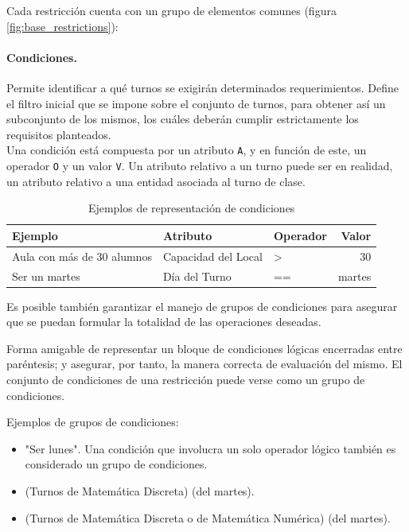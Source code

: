 Cada restricción cuenta con un grupo de elementos comunes (figura \ref{fig:base_restrictions}):\\

\paragraph{Condiciones.}
Permite identificar a qué turnos se exigirán determinados requerimientos. Define el filtro inicial que se impone sobre el conjunto de turnos, para obtener así un subconjunto de los mismos, los cuáles deberán cumplir estrictamente los requisitos planteados.\\
	
Una condición está compuesta por un atributo \texttt{A}, y en función de este, un operador \texttt{O} y un valor \texttt{V}. Un atributo relativo a un turno puede ser en realidad, un atributo relativo a una entidad asociada al turno de clase.\\

\begin{table}[h]
	\centering
	\begin{tabular}[c]{l|l|l|r}
		\textbf{Ejemplo}                   & \textbf{Atributo}     & \textbf{Operador} & \textbf{Valor} \\ 
		\hline 
		Aula con más de 30 alumnos         &  Capacidad del Local  & >                 & 30             \\ 
		Ser un martes					   & Día del Turno         & ==                & martes
	\end{tabular}
	\caption{Ejemplos de representación de condiciones}
	\label{tab:conditions}		
\end{table}

Es posible también garantizar el manejo de grupos de condiciones para asegurar que se puedan formular la totalidad de las operaciones deseadas.

\begin{dfn}
	Forma amigable de representar un bloque de condiciones lógicas encerradas entre paréntesis; y asegurar, por tanto, la manera correcta de evaluación del mismo. El conjunto de condiciones de una restricción puede verse como un grupo de condiciones.
\end{dfn}

Ejemplos de grupos de condiciones: 
\begin{itemize}
	\item "Ser lunes". Una condición que involucra un solo operador lógico también es considerado un grupo de condiciones.
	\item (Turnos de Matemática Discreta) (del martes). 
	\item (Turnos de Matemática Discreta o de Matemática Numérica) (del martes).
\end{itemize}


